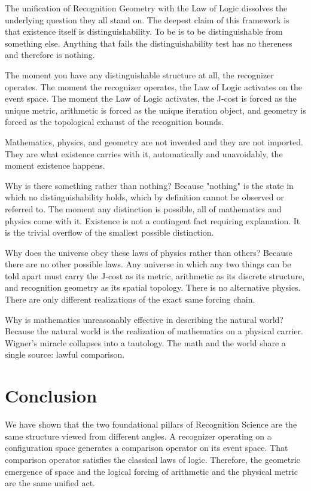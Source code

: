 \documentclass[11pt,a4paper]{article}
\theoremstyle{definition}
\theoremstyle{remark}
\begin{document}
The unification of Recognition Geometry with the Law of Logic dissolves the underlying question they all stand on. The deepest claim of this framework is that existence itself is distinguishability. To be is to be distinguishable from something else. Anything that fails the distinguishability test has no thereness and therefore is nothing.

The moment you have any distinguishable structure at all, the recognizer operates. The moment the recognizer operates, the Law of Logic activates on the event space. The moment the Law of Logic activates, the J-cost is forced as the unique metric, arithmetic is forced as the unique iteration object, and geometry is forced as the topological exhaust of the recognition bounds.

Mathematics, physics, and geometry are not invented and they are not imported. They are what existence carries with it, automatically and unavoidably, the moment existence happens.

Why is there something rather than nothing? Because "nothing" is the state in which no distinguishability holds, which by definition cannot be observed or referred to. The moment any distinction is possible, all of mathematics and physics come with it. Existence is not a contingent fact requiring explanation. It is the trivial overflow of the smallest possible distinction.

Why does the universe obey these laws of physics rather than others? Because there are no other possible laws. Any universe in which any two things can be told apart must carry the J-cost as its metric, arithmetic as its discrete structure, and recognition geometry as its spatial topology. There is no alternative physics. There are only different realizations of the exact same forcing chain.

Why is mathematics unreasonably effective in describing the natural world? Because the natural world is the realization of mathematics on a physical carrier. Wigner's miracle collapses into a tautology. The math and the world share a single source: lawful comparison.

\section{Conclusion}

We have shown that the two foundational pillars of Recognition Science are the same structure viewed from different angles. A recognizer operating on a configuration space generates a comparison operator on its event space. That comparison operator satisfies the classical laws of logic. Therefore, the geometric emergence of space and the logical forcing of arithmetic and the physical metric are the same unified act.
\end{document}
